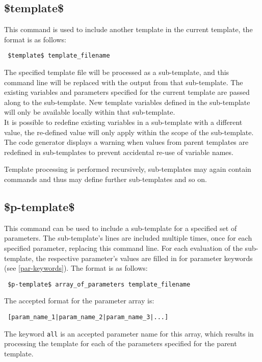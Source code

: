 \documentclass{settings/TU_Delft_Report}
\begin{document}
\subsection{\$template\$}
This command is used to include another template in the current template, the format is as follows:
\begin{lstlisting}
 $template$ template_filename
\end{lstlisting}

The specified template file will be processed as a sub-template, and this command line will be replaced with the output from that sub-template. The existing variables and parameters specified for the current template are passed along to the sub-template. New template variables defined in the sub-template will only be available locally within that sub-template.\\

It is possible to redefine existing variables in a sub-template with a different value, the re-defined value will only apply within the scope of the sub-template. The code generator displays a warning when values from parent templates are redefined in sub-templates to prevent accidental re-use of variable names.

Template processing is performed recursively, sub-templates may again contain commands and thus may define further sub-templates and so on.

\subsection{\$p-template\$} \label{p-template}
This command can be used to include a sub-template for a specified set of parameters. The sub-template's lines are included multiple times, once for each specified parameter, replacing this command line. For each evaluation of the sub-template, the respective parameter's values are filled in for parameter keywords (see \ref{par-keywords}). The format is as follows:
\begin{lstlisting}
 $p-template$ array_of_parameters template_filename
\end{lstlisting}
The accepted format for the parameter array is:
\begin{lstlisting}
 [param_name_1|param_name_2|param_name_3|...]
\end{lstlisting}
The keyword \lstinline{all} is an accepted parameter name for this array, which results in processing the template for each of the parameters specified for the parent template.
\end{document}

